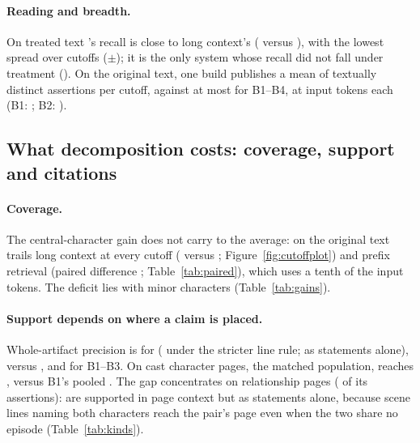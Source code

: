 \paragraph{Reading and breadth.}
On treated text \sys's recall is close to long context's (
versus ), with the lowest spread over cutoffs
($\pm$); it is the only system whose recall did not fall under
treatment (). On the original text, one build publishes a mean of
 textually distinct assertions per cutoff, against at most
 for B1--B4, at
 input tokens each (B1: ; B2: ).

\subsection{What decomposition costs: coverage, support and citations}
\label{sec:results-quality}
\paragraph{Coverage.}
The central-character gain does not carry to the average: on the original text \sys
trails long context at every cutoff ( versus ;
Figure~\ref{fig:cutoffplot}) and prefix retrieval (paired difference
; Table~\ref{tab:paired}), which uses a tenth of the input
tokens. The deficit lies with minor characters (Table~\ref{tab:gains}).

\paragraph{Support depends on where a claim is placed.}
Whole-artifact precision is  for \sys ( under the
stricter line rule;  as statements alone), versus
,  and  for B1--B3.
On cast character pages, the matched population, \sys reaches ,
versus B1's pooled . The gap concentrates on relationship pages
( of its assertions):  are supported in
page context but  as statements alone, because scene lines naming
both characters reach the pair's page even when the two share no episode
(Table~\ref{tab:kinds}).

